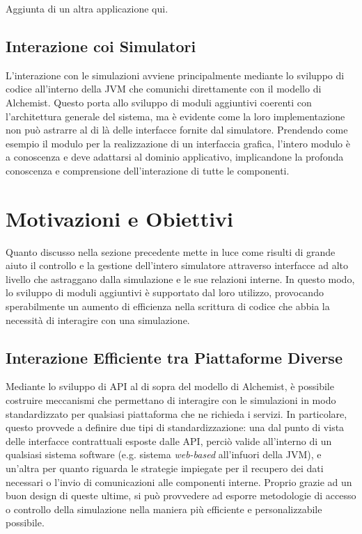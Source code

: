 Aggiunta di un altra applicazione qui.

\subsection{Interazione coi Simulatori}\label{ssec:sim-interactions}
L'interazione con le simulazioni avviene principalmente mediante lo sviluppo di codice all'interno della \ac{JVM} che comunichi direttamente con il modello di Alchemist.
Questo porta allo sviluppo di moduli aggiuntivi coerenti con l'architettura generale del sistema, ma è evidente come la loro implementazione non può astrarre al di là delle interfacce fornite
dal simulatore. Prendendo come esempio il modulo per la realizzazione di un interfaccia grafica, l'intero modulo è a conoscenza e deve adattarsi al dominio applicativo, implicandone 
la profonda conoscenza e comprensione dell'interazione di tutte le componenti.

\section{Motivazioni e Obiettivi}\label{sec:motivations-objectives}
Quanto discusso nella sezione precedente mette in luce come risulti di grande aiuto il controllo e la gestione dell'intero simulatore attraverso interfacce ad alto livello che astraggano dalla simulazione
e le sue relazioni interne. In questo modo, lo sviluppo di moduli aggiuntivi è supportato dal loro utilizzo, provocando sperabilmente un aumento di efficienza nella scrittura di codice che abbia la necessità
di interagire con una simulazione.

\subsection{Interazione Efficiente tra Piattaforme Diverse}\label{ssec:platforms-interactions}
Mediante lo sviluppo di API al di sopra del modello di Alchemist, è possibile costruire meccanismi che permettano di interagire con le simulazioni in modo standardizzato per qualsiasi piattaforma che
ne richieda i servizi. In particolare, questo provvede a definire due tipi di standardizzazione: una dal punto di vista delle interfacce contrattuali esposte dalle API, perciò valide all'interno
di un qualsiasi sistema software (e.g. sistema \textit{web-based} all'infuori della \ac{JVM}), e un'altra per quanto riguarda
le strategie impiegate per il recupero dei dati necessari o l'invio di comunicazioni alle componenti interne. Proprio grazie ad un buon design di queste ultime, si può provvedere ad esporre metodologie
di accesso o controllo della simulazione nella maniera più efficiente e personalizzabile possibile.

